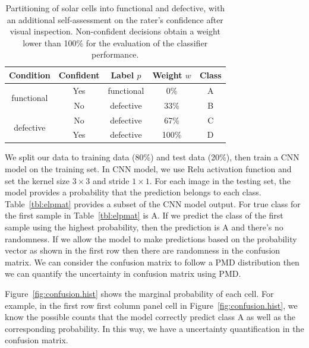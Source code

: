 \documentclass[12pt]{article}
\begin{document}
\begin{table}%
\caption{Partitioning of solar cells into functional and defective, with an additional self-assessment on the rater's confidence after visual inspection. Non-confident decisions obtain a weight lower than 100\% for the evaluation of the classifier performance.}\label{tbl:el.label}
\begin{center}	
\begin{tabular}{c|c|c|c|c}
		\hline
		\hline
		Condition  & Confident  &  Label $p$ & Weight $w$ & Class \\
		\hline
		\multirow{2}{*}{functional} & Yes & functional & 0\% & A\\
		& No& defective  & 33\% & B\\
		\hline
		\multirow{2}{*}{defective} & No & defective & 67\% & C\\
		& Yes & defective & 100\%  &D\\
		\hline
		\hline
	\end{tabular}
\end{center}
\end{table}

We split our data to training data (80\%) and test data (20\%), then train a CNN \cite{long2015fully} model on the training set. In CNN model, we use Relu activation function and set the kernel size $3 \times 3$ and stride $1 \times 1$. For each image in the testing set, the model provides a probability that the prediction belongs to each class. Table~\ref{tbl:elpmat} provides a subset of the CNN model output. For true class for the first sample in Table~\ref{tbl:elpmat} is A. If we predict the class of the first sample using the highest probability, then the prediction is A and there's no randomness. If we allow the model to make predictions based on the probability vector as shown in the first row then there are randomness in the confusion matrix. We can consider the confusion matrix to follow a PMD distribution then we can quantify the uncertainty in confusion matrix using PMD.

Figure~\ref{fig:confusion.hist} shows the marginal probability of each cell. For example, in the first row first column panel cell in Figure~\ref{fig:confusion.hist}, we know the possible counts that the model correctly predict class A as well as the corresponding probability. In this way, we have a uncertainty quantification in the confusion matrix.
\end{document}
